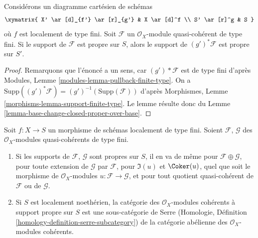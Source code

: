 \begin{lemma}
\label{lemma-base-change-module-support-proper-over-base}
Considérons un diagramme cartésien de schémas
$$
\xymatrix{
X' \ar[d]_{f'} \ar[r]_{g'} & X \ar[d]^f \\
S' \ar[r]^g & S
}
$$
où $f$ est localement de type fini. Soit $\mathcal{F}$ un
$\mathcal{O}_X$-module quasi-cohérent de type fini.
Si le support de $\mathcal{F}$ est propre sur $S$, alors
le support de $(g')^*\mathcal{F}$ est propre sur $S'$.
\end{lemma}

\begin{proof}
Remarquons que l'énoncé a un sens, car
$(g')*\mathcal{F}$ est de type fini d'après
Modules, Lemme \ref{modules-lemma-pullback-finite-type}.
On a $\text{Supp}((g')^*\mathcal{F}) = (g')^{-1}(\text{Supp}(\mathcal{F}))$
d'après Morphismes, Lemme \ref{morphisms-lemma-support-finite-type}.
Le lemme résulte donc du
Lemme \ref{lemma-base-change-closed-proper-over-base}.
\end{proof}

\begin{lemma}
\label{lemma-cat-module-support-proper-over-base}
Soit $f : X \to S$ un morphisme de schémas localement
de type fini. Soient $\mathcal{F}$, $\mathcal{G}$
des $\mathcal{O}_X$-modules quasi-cohérents de type fini.
\begin{enumerate}
\item Si les supports de $\mathcal{F}$, $\mathcal{G}$
sont propres sur $S$, il en va de même
pour $\mathcal{F} \oplus \mathcal{G}$, pour toute extension
de $\mathcal{G}$ par $\mathcal{F}$, pour $\Im(u)$ et $\Coker(u)$,
quel que soit le morphisme de $\mathcal{O}_X$-modules $u : \mathcal{F} \to \mathcal{G}$,
et pour tout quotient quasi-cohérent de $\mathcal{F}$ ou de $\mathcal{G}$.
\item Si $S$ est localement noethérien, la catégorie des
$\mathcal{O}_X$-modules cohérents à support propre sur
$S$ est une sous-catégorie de Serre (Homologie, Définition
\ref{homology-definition-serre-subcategory})
de la catégorie abélienne des
$\mathcal{O}_X$-modules cohérents.
\end{enumerate}
\end{lemma}

